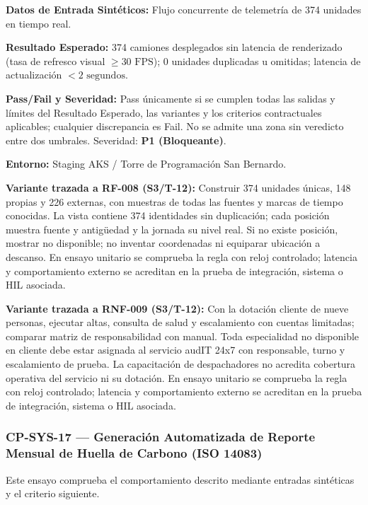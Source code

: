 \par\noindent\textbf{Datos de Entrada Sintéticos:} Flujo concurrente de telemetría de 374 unidades en tiempo real.\par
\par\noindent\textbf{Resultado Esperado:} 374 camiones desplegados sin latencia de renderizado (tasa de refresco visual \(\ge 30\text{ FPS}\)); 0 unidades duplicadas u omitidas; latencia de actualización \(< 2\text{ segundos}\).\par
\par\noindent\textbf{Pass/Fail y Severidad:} Pass únicamente si se cumplen todas las salidas y límites del Resultado Esperado, las variantes y los criterios contractuales aplicables; cualquier discrepancia es Fail. No se admite una zona sin veredicto entre dos umbrales. Severidad: \textbf{P1 (Bloqueante)}.\par
\par\noindent\textbf{Entorno:} Staging AKS / Torre de Programación San Bernardo.\par

\par\noindent\textbf{Variante trazada a RF-008 (S3/T-12):} Construir 374 unidades únicas, 148 propias y 226 externas, con muestras de todas las fuentes y marcas de tiempo conocidas. La vista contiene 374 identidades sin duplicación; cada posición muestra fuente y antigüedad y la jornada su nivel real. Si no existe posición, mostrar no disponible; no inventar coordenadas ni equiparar ubicación a descanso. En ensayo unitario se comprueba la regla con reloj controlado; latencia y comportamiento externo se acreditan en la prueba de integración, sistema o HIL asociada.\par

\par\noindent\textbf{Variante trazada a RNF-009 (S3/T-12):} Con la dotación cliente de nueve personas, ejecutar altas, consulta de salud y escalamiento con cuentas limitadas; comparar matriz de responsabilidad con manual. Toda especialidad no disponible en cliente debe estar asignada al servicio audIT 24x7 con responsable, turno y escalamiento de prueba. La capacitación de despachadores no acredita cobertura operativa del servicio ni su dotación. En ensayo unitario se comprueba la regla con reloj controlado; latencia y comportamiento externo se acreditan en la prueba de integración, sistema o HIL asociada.\par


\subsubsection*{CP-SYS-17 — Generación Automatizada de Reporte Mensual de Huella de Carbono (ISO 14083)}\label{sec:9-cp-sys-17}
Este ensayo comprueba el comportamiento descrito mediante entradas sintéticas y el criterio siguiente.

